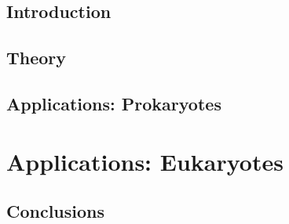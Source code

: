 \documentclass[letterpaper,12pt]{memoir}
\begin{document}
\DoubleSpacing

\thesistitlepage

\thesiscopyrightpage

\thesisabstract

\frontmatter

\tableofcontents
\clearpage

\listoffigures
\clearpage

\listoftables
\clearpage

\mainmatter

\chapter{Introduction}
\label{ch:introduction}


\chapter{Theory}
\label{ch:theory}
% 

\chapter{Applications: Prokaryotes}
\label{part:bacteria}
% 

\part{Applications: Eukaryotes}
\label{part:human}
% 

\chapter{Conclusions}
\label{ch:conclusions}
% 

\backmatter

\SingleSpacing
\printbibliography
\end{document}
